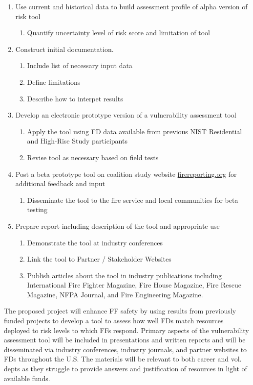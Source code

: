 \documentclass[12pt,letterpaper]{article}
\begin{document}
\begin{enumerate}
\begin{enumerate}
	\end{enumerate}
	\item Use current and historical data to build assessment profile of alpha version of risk tool
	\begin{enumerate}
		\item Quantify uncertainty level of risk score and limitation of tool
	\end{enumerate}
		\item Construct initial documentation. 
	\begin{enumerate}
		\item Include list of necessary input data
		\item Define limitations
		\item Describe how to interpet results
	\end{enumerate}
	\item Develop an electronic prototype version of a vulnerability assessment tool 
	\begin{enumerate}
		\item Apply the tool using FD data available from previous NIST Residential and High-Rise Study participants 
		\item Revise tool as necessary based on field tests
	\end{enumerate}
	\item Post a beta prototype tool on coalition study website \href{www.firereporting.org}{firereporting.org} for additional feedback and input
	\begin{enumerate}
		\item Disseminate the tool to the fire service and local communities for beta testing
	\end{enumerate}	
	\item Prepare report including description of the tool and appropriate use 
	\begin{enumerate}
		\item Demonstrate the tool at industry conferences 
		\item Link the tool to Partner / Stakeholder Websites 
		\item Publish articles about the tool in industry publications including International Fire Fighter Magazine, Fire House Magazine, Fire Rescue Magazine, NFPA Journal, and Fire Engineering Magazine.
	\end{enumerate}
\end{enumerate}

The proposed project will enhance FF safety by using results from previously funded projects to develop a tool to assess how well FDs match resources deployed to risk levels to which FFs respond. Primary aspects of the vulnerability assessment tool will be included in presentations and written reports and will be disseminated via industry conferences, industry journals, and partner websites to FDs throughout the U.S. The materials will be relevant to both career and vol. depts as they struggle to provide answers and justification of resources in light of available funds.
\end{document}
